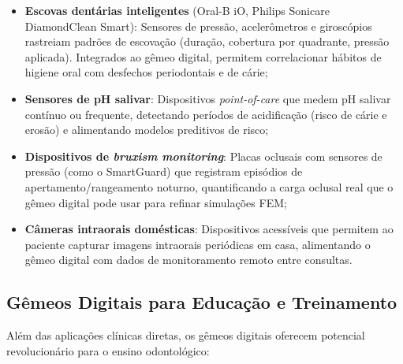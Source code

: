 \begin{itemize}
    \item \textbf{Escovas dentárias inteligentes} (Oral-B iO, Philips Sonicare DiamondClean Smart): Sensores de pressão, acelerômetros e giroscópios rastreiam padrões de escovação (duração, cobertura por quadrante, pressão aplicada). Integrados ao gêmeo digital, permitem correlacionar hábitos de higiene oral com desfechos periodontais e de cárie;

    \item \textbf{Sensores de pH salivar}: Dispositivos \textit{point-of-care} que medem pH salivar contínuo ou frequente, detectando períodos de acidificação (risco de cárie e erosão) e alimentando modelos preditivos de risco;

    \item \textbf{Dispositivos de \textit{bruxism monitoring}}: Placas oclusais com sensores de pressão (como o SmartGuard) que registram episódios de apertamento/rangeamento noturno, quantificando a carga oclusal real que o gêmeo digital pode usar para refinar simulações FEM;

    \item \textbf{Câmeras intraorais domésticas}: Dispositivos acessíveis que permitem ao paciente capturar imagens intraorais periódicas em casa, alimentando o gêmeo digital com dados de monitoramento remoto entre consultas.
\end{itemize}


\subsection{Gêmeos Digitais para Educação e Treinamento}

Além das aplicações clínicas diretas, os gêmeos digitais oferecem potencial revolucionário para o ensino odontológico:


